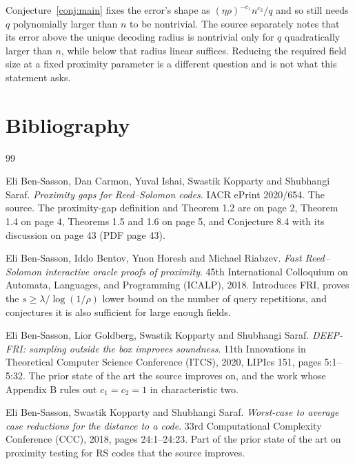 \documentclass{aicr-conjecture}
\begin{document}
\begin{remark}
Conjecture~\ref{conj:main} fixes the error's shape as
$(\eta\rho)^{-c_{1}} n^{c_{2}}/q$ and so still needs $q$ polynomially
larger than $n$ to be nontrivial. The source separately notes that its
error above the unique decoding radius is nontrivial only for $q$
quadratically larger than $n$, while below that radius linear suffices.
Reducing the required field size at a fixed proximity parameter is a
different question and is not what this statement asks.
\end{remark}

\section{Bibliography}

\begin{aicrbibliography}{99}

Eli Ben-Sasson, Dan Carmon, Yuval Ishai, Swastik Kopparty and Shubhangi
Saraf.
\emph{Proximity gaps for Reed--Solomon codes}.
IACR ePrint 2020/654.
The source. The proximity-gap definition and Theorem 1.2 are on page 2,
Theorem 1.4 on page 4, Theorems 1.5 and 1.6 on page 5, and
Conjecture 8.4 with its discussion on page 43 (PDF page 43).

Eli Ben-Sasson, Iddo Bentov, Ynon Horesh and Michael Riabzev.
\emph{Fast Reed--Solomon interactive oracle proofs of proximity}.
45th International Colloquium on Automata, Languages, and Programming
(ICALP), 2018.
Introduces FRI, proves the $s \ge \lambda/\log(1/\rho)$ lower bound on
the number of query repetitions, and conjectures it is also sufficient
for large enough fields.

Eli Ben-Sasson, Lior Goldberg, Swastik Kopparty and Shubhangi Saraf.
\emph{DEEP-FRI: sampling outside the box improves soundness}.
11th Innovations in Theoretical Computer Science Conference (ITCS), 2020,
LIPIcs 151, pages 5:1--5:32.
The prior state of the art the source improves on, and the work whose
Appendix B rules out $c_{1} = c_{2} = 1$ in characteristic two.

Eli Ben-Sasson, Swastik Kopparty and Shubhangi Saraf.
\emph{Worst-case to average case reductions for the distance to a code}.
33rd Computational Complexity Conference (CCC), 2018, pages
24:1--24:23.
Part of the prior state of the art on proximity testing for RS codes that
the source improves.

\end{aicrbibliography}
\end{document}
